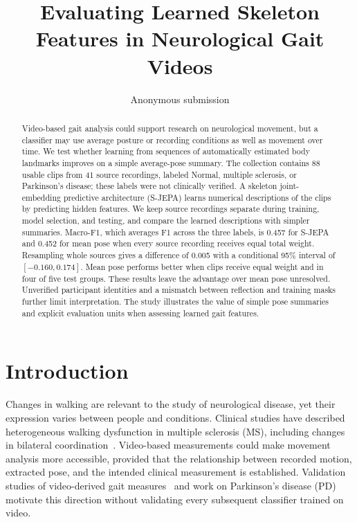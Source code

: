 \documentclass[10pt,twocolumn,letterpaper]{article}
\title{Evaluating Learned Skeleton Features in Neurological Gait Videos}
\author{Anonymous submission}
\begin{document}
\maketitle
\begin{abstract}
Video-based gait analysis could support research on neurological movement, but a classifier may use average posture or recording conditions as well as movement over time. We test whether learning from sequences of automatically estimated body landmarks improves on a simple average-pose summary. The collection contains 88 usable clips from 41 source recordings, labeled Normal, multiple sclerosis, or Parkinson's disease; these labels were not clinically verified. A skeleton joint-embedding predictive architecture (S-JEPA) learns numerical descriptions of the clips by predicting hidden features. We keep source recordings separate during training, model selection, and testing, and compare the learned descriptions with simpler summaries. Macro-F1, which averages F1 across the three labels, is 0.457 for S-JEPA and 0.452 for mean pose when every source recording receives equal total weight. Resampling whole sources gives a difference of 0.005 with a conditional 95\% interval of $[-0.160,0.174]$. Mean pose performs better when clips receive equal weight and in four of five test groups. These results leave the advantage over mean pose unresolved. Unverified participant identities and a mismatch between reflection and training masks further limit interpretation. The study illustrates the value of simple pose summaries and explicit evaluation units when assessing learned gait features.
\end{abstract}

\section{Introduction}
Changes in walking are relevant to the study of neurological disease, yet their expression varies between people and conditions. Clinical studies have described heterogeneous walking dysfunction in multiple sclerosis (MS), including changes in bilateral coordination~\cite{filli2018,plotnik2020}. Video-based measurements could make movement analysis more accessible, provided that the relationship between recorded motion, extracted pose, and the intended clinical measurement is established. Validation studies of video-derived gait measures~\cite{stenum2021,stenum2024} and work on Parkinson's disease (PD)~\cite{shin2021} motivate this direction without validating every subsequent classifier trained on video.
\end{document}
